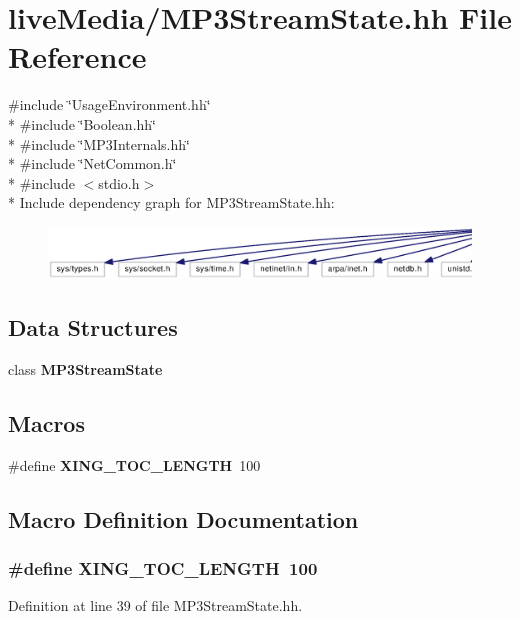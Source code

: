 \section{live\+Media/\+M\+P3\+Stream\+State.hh File Reference}
\label{MP3StreamState_8hh}
{\ttfamily \#include \char`\"{}Usage\+Environment.\+hh\char`\"{}}\\*
{\ttfamily \#include \char`\"{}Boolean.\+hh\char`\"{}}\\*
{\ttfamily \#include \char`\"{}M\+P3\+Internals.\+hh\char`\"{}}\\*
{\ttfamily \#include \char`\"{}Net\+Common.\+h\char`\"{}}\\*
{\ttfamily \#include $<$stdio.\+h$>$}\\*
Include dependency graph for M\+P3\+Stream\+State.\+hh\+:
\nopagebreak
\begin{figure}[H]
\begin{center}
\leavevmode
\includegraphics[width=350pt]{MP3StreamState_8hh__incl}
\end{center}
\end{figure}
\subsection*{Data Structures}
\begin{DoxyCompactItemize}
\item 
class {\bf M\+P3\+Stream\+State}
\end{DoxyCompactItemize}
\subsection*{Macros}
\begin{DoxyCompactItemize}
\item 
\#define {\bf X\+I\+N\+G\+\_\+\+T\+O\+C\+\_\+\+L\+E\+N\+G\+T\+H}~100
\end{DoxyCompactItemize}


\subsection{Macro Definition Documentation}
\subsubsection[{X\+I\+N\+G\+\_\+\+T\+O\+C\+\_\+\+L\+E\+N\+G\+T\+H}]{\setlength{\rightskip}{0pt plus 5cm}\#define X\+I\+N\+G\+\_\+\+T\+O\+C\+\_\+\+L\+E\+N\+G\+T\+H~100}\label{MP3StreamState_8hh_a97df2715e14b9c64a3c882d4a89d74fc}


Definition at line 39 of file M\+P3\+Stream\+State.\+hh.

